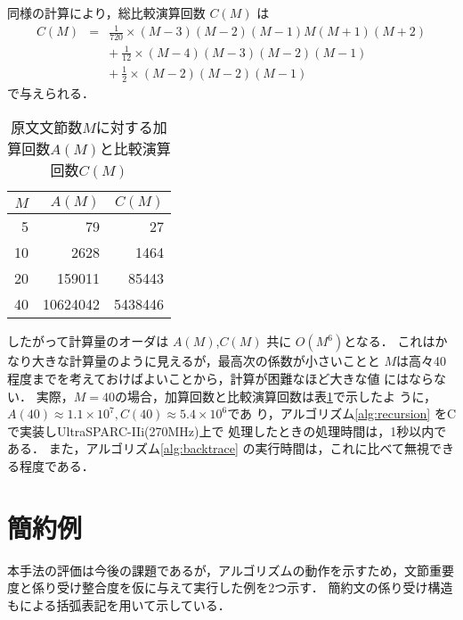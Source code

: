 同様の計算により，総比較演算回数 $C(M)$ は
\begin{eqnarray*}
 C(M) & = & \tfrac{1}{720}{\times}(M-3)(M-2)(M-1)M(M+1)(M+2) \nonumber\\
      &   & +\ \tfrac{1}{12}{\times}(M-4)(M-3)(M-2)(M-1) \nonumber\\
      &   & +\ \tfrac{1}{2}{\times}(M-2)(M-2)(M-1)
\end{eqnarray*}
で与えられる．

\begin{table}[hntb]
\center
\caption{原文文節数$M$に対する加算回数$A(M)$と比較演算回数$C(M)$}
\label{tbl:order}
\begin{tabular}{rrr}
 $M$ & $A(M)$ & $C(M)$ \\
 \hline
 5 & 79 & 27 \\
 10 & 2628 & 1464 \\
 20 & 159011 & 85443 \\
 40 & 10624042 & 5438446 \\
\end{tabular}
\end{table}

\hspace{-11pt}
したがって計算量のオーダは $A(M)$,$C(M)$ 共に $O(M^6)$となる．
これはかなり大きな計算量のように見えるが，最高次の係数が小さいことと
$M$は高々40程度までを考えておけばよいことから，計算が困難なほど大きな値
にはならない．
実際，$M=40$の場合，加算回数と比較演算回数は表\ref{tbl:order}で示したよ
うに，$A(40){\approx}1.1{\times}10^7,C(40){\approx}5.4{\times}10^6$であ
り，アルゴリズム\ref{alg:recursion} をCで実装しUltraSPARC-IIi(270MHz)上で
処理したときの処理時間は，1秒以内である．
また，アルゴリズム\ref{alg:backtrace} の実行時間は，これに比べて無視でき
る程度である．
\vspace{-3mm}
\section{簡約例}
本手法の評価は今後の課題であるが，アルゴリズムの動作を示すため，文節重要
度と係り受け整合度を仮に与えて実行した例を2つ示す．
簡約文の係り受け構造も\cite{ozeki}による括弧表記を用いて示している．

